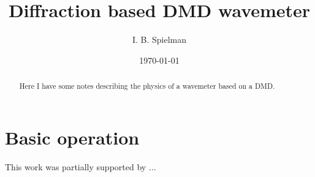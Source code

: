 \documentclass[letterpaper,preprint,aps,pra,superscriptaddress]{revtex4-1}
\begin{document}
\title{Diffraction based DMD wavemeter}

\author{I. B. Spielman}

\date{\today}
\begin{abstract}
Here I have some notes describing the physics of a wavemeter based on a DMD.
\end{abstract}
\maketitle

\section{Basic operation}


\begin{acknowledgments}
This work was partially supported by ...
\end{acknowledgments}


% 
\end{document}
